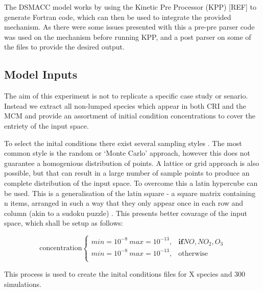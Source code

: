 The DSMACC model works by using the Kinetic Pre Processor (KPP) [REF] to generate Fortran code, which can then be used to integrate the provided mechanism. As there were some issues presented with this a pre-pre parser code was used on the mechanism before running KPP, and a post parser on some of the files to provide the desired output. 

\subsection{Model Inputs}
The aim of this experiment is not to replicate a specific case study or senario. Instead we extract all non-lumped species which appear in both CRI and the MCM and provide an assortment of initial condition concentrations to cover the entriety of the input space.

To select the inital conditions there exist several sampling styles \cite{sampling}. The most common style is the random or `Monte Carlo' approach, however this does not guarantee a homogenious distribution of points. A lattice or grid approach is also possible, but that can result in a large number of sample points to produce an complete distribution of the input space. To overcome this a latin hypercube can be used. This is a generalisation of the latin square  -  a square matrix containing n items, arranged in such a way that they only appear once in each row and column (akin to a sudoku puzzle) \cite{lsq}. This presents better covarage of the input space, which shall be setup as follows:

\begin{equation}
\text{concentration}
    \begin{cases}
      min = 10^{-8} \ max=10^{-13} , & \mathbf{if} NO,NO_2,O_3\\
      min = 10^{-8} \ max=10^{-13} , & \text{otherwise}\\
    \end{cases}
\label{eqn:icslhs}
  \end{equation}

This process is used to create the inital conditions files for X species and 300 simulations. 